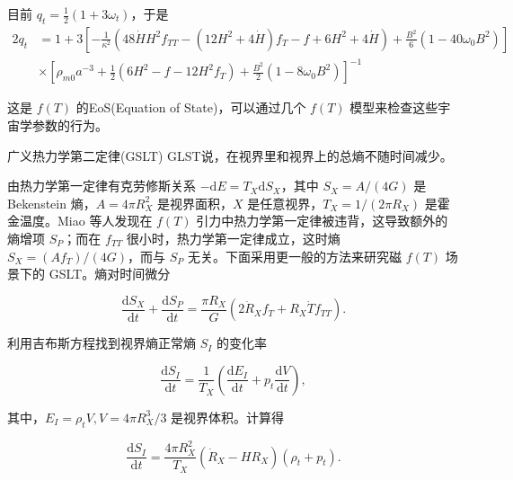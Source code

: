 \documentclass[9pt, dvipsnames]{beamer} %
\begin{document}
\begin{frame}
    目前 $q_t=\frac{1}{2}(1+3\omega_t)$，于是
    $$
    \begin{aligned}
        2q_t
        &=1 + 3\left[-\frac{1 }{\kappa^2 } \left(48\dot{H} H^2 f_{TT} - \left(12 H^2 + 4\dot{H} \right) f_T - f + 6H^2 + 4\dot{H} \right) + \frac{B^2 }{6 } \left(1-40\omega_0 B^2 \right) \right] \\
        &\times \left[\rho_{m0}a^{-3} + \frac{1 }{2 } \left(6H^2-f-12H^2 f_T \right) + \frac{B^2 }{2 } \left(1-8\omega_0 B^2 \right) \right]^{-1}
    \end{aligned}
    $$

    这是 $f(T)$ 的EoS(Equation of State)，可以通过几个 $f(T)$ 模型来检查这些宇宙学参数的行为。
\end{frame}

\begin{frame}{广义热力学第二定律(GSLT)}
    GLST说，在视界里和视界上的总熵不随时间减少。

    由热力学第一定律有克劳修斯关系 $-\mathrm{d}E=T_X\mathrm{d}S_X$，其中 $S_X=A/(4G)$ 是 Bekenstein 熵，$A=4\pi R_X^2$ 是视界面积，$X$ 是任意视界，$T_X=1/(2\pi R_X)$ 是霍金温度。Miao 等人发现在 $f(T)$ 引力中热力学第一定律被违背，这导致额外的熵增项 $S_P$；而在 $f_{TT}$ 很小时，热力学第一定律成立，这时熵 $S_X=(Af_T)/(4G)$，而与 $S_P$ 无关。下面采用更一般的方法来研究磁 $f(T)$ 场景下的 GSLT。熵对时间微分

    $$
    \frac{\mathrm{d}S_X }{\mathrm{d}t } + \frac{\mathrm{d}S_P }{\mathrm{d}t } = \frac{\pi R_X }{G } \left(2\dot{R}_X f_T + R_X\dot{T} f_{TT} \right).
    $$

    利用吉布斯方程找到视界熵正常熵 $S_I$ 的变化率

    $$
    \frac{\mathrm{d}S_I }{\mathrm{d}t } 
    =\frac{1 }{T_X } \left(\frac{\mathrm{d}E_I }{\mathrm{d}t } + p_t\frac{\mathrm{d}V }{\mathrm{d}t }  \right),
    $$

    其中，$E_I=\rho_t V,V=4\pi R_X^3/3$ 是视界体积。计算得

    $$
    \frac{\mathrm{d}S_I }{\mathrm{d}t } 
    =\frac{4\pi R_X^2 }{T_X } \left(\dot{R}_X - H R_X \right)\left(\rho_t+p_t \right).
    $$
    
\end{frame}
\end{document}
